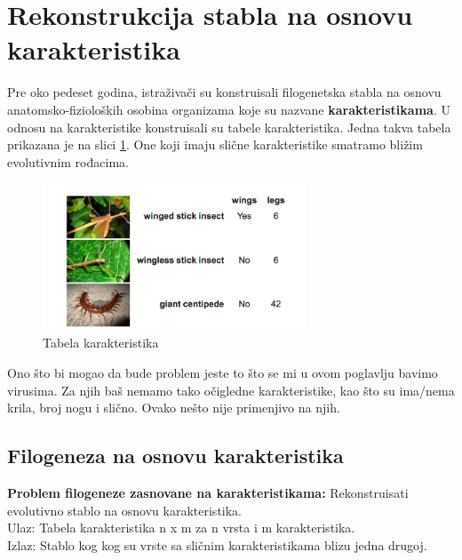 \section{Rekonstrukcija stabla na osnovu karakteristika}
\label{sec:rsnok}

Pre oko pedeset godina, istra\v{z}iva\v{c}i su konstruisali filogenetska stabla na osnovu anatomsko-fiziolo\v{s}kih osobina organizama koje su nazvane \textbf{karakteristikama}. U odnosu na karakteristike konstruisali su tabele karakteristika. Jedna takva tabela prikazana je na slici  \ref{fig:karak}. One koji imaju slične karakteristike smatramo bližim evolutivnim rođacima.

\begin{figure}[h!]
\begin{center}
\includegraphics[width=0.7\textwidth]{poglavlja/7/slike/slika10.png}
\caption{Tabela karakteristika}
\label{fig:karak}
\end{center}
\end{figure}

Ono što bi mogao da bude problem jeste to što se mi u ovom poglavlju bavimo virusima. Za njih baš nemamo tako očigledne karakteristike, kao što su ima/nema krila, broj nogu i slično. Ovako nešto nije primenjivo na njih.

\subsection{Filogeneza na osnovu karakteristika}
\label{subsec:fnok}

\begin{tcolorbox}
\textbf{Problem filogeneze zasnovane na karakteristikama:} Rekonstruisati evolutivno stablo na osnovu karakteristika. \\
Ulaz: Tabela karakteristika n x m za n vrsta i m karakteristika. \\
Izlaz: Stablo kog kog su vrste sa sli\v{c}nim karakteristikama blizu jedna drugoj. 
\end{tcolorbox}

